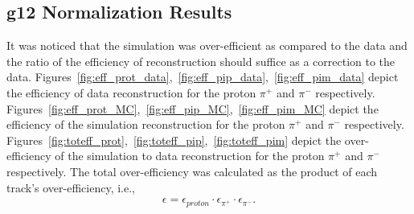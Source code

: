 \documentclass[11pt,a4paper]{article}
\begin{document}
\subsection{g12 Normalization Results}

It was noticed that the simulation was over-efficient as compared to the data and the ratio of the efficiency of reconstruction should suffice as a correction to the data. Figures~\ref{fig:eff_prot_data},~\ref{fig:eff_pip_data},~\ref{fig:eff_pim_data} depict the efficiency of data reconstruction for the proton $\pi^+$ and $\pi^-$ respectively. Figures~\ref{fig:eff_prot_MC},~\ref{fig:eff_pip_MC},~\ref{fig:eff_pim_MC} depict the efficiency of the simulation reconstruction for the proton $\pi^+$ and $\pi^-$ respectively. Figures~\ref{fig:toteff_prot},~\ref{fig:toteff_pip},~\ref{fig:toteff_pim} depict the over-efficiency of the simulation to data reconstruction for the proton $\pi^+$ and $\pi^-$ respectively.
The total over-efficiency was calculated as the product of each track's over-efficiency, i.e.,
\begin{align}\label{eq:eff_tot}
  \epsilon = \epsilon_{proton}\cdot\epsilon_{\pi^+}\cdot\epsilon_{\pi^-}.
\end{align}
\end{document}
